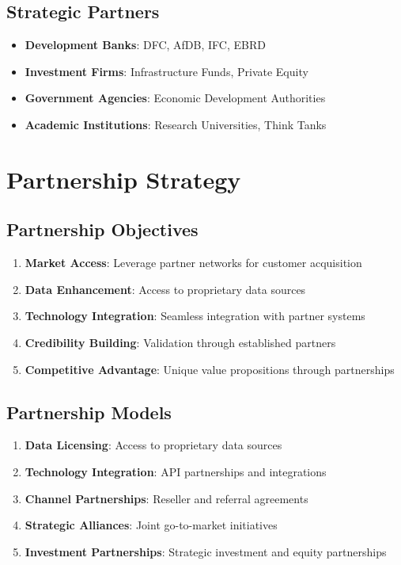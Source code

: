 \documentclass[business]{../templates/infraradar-main}
\begin{document}
\subsection{Strategic Partners}
\begin{itemize}
    \item \textbf{Development Banks}: DFC, AfDB, IFC, EBRD
    \item \textbf{Investment Firms}: Infrastructure Funds, Private Equity
    \item \textbf{Government Agencies}: Economic Development Authorities
    \item \textbf{Academic Institutions}: Research Universities, Think Tanks
\end{itemize}

\section{Partnership Strategy}

\subsection{Partnership Objectives}
\begin{enumerate}
    \item \textbf{Market Access}: Leverage partner networks for customer acquisition
    \item \textbf{Data Enhancement}: Access to proprietary data sources
    \item \textbf{Technology Integration}: Seamless integration with partner systems
    \item \textbf{Credibility Building}: Validation through established partners
    \item \textbf{Competitive Advantage}: Unique value propositions through partnerships
\end{enumerate}

\subsection{Partnership Models}
\begin{enumerate}
    \item \textbf{Data Licensing}: Access to proprietary data sources
    \item \textbf{Technology Integration}: API partnerships and integrations
    \item \textbf{Channel Partnerships}: Reseller and referral agreements
    \item \textbf{Strategic Alliances}: Joint go-to-market initiatives
    \item \textbf{Investment Partnerships}: Strategic investment and equity partnerships
\end{enumerate}
\end{document}
